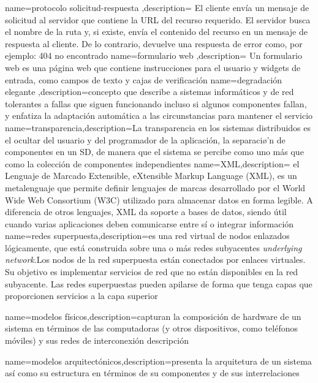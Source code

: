 {name={protocolo solicitud-respuesta },description={ El cliente envía un mensaje de solicitud al servidor que contiene la URL del recurso requerido. El servidor busca el nombre de la ruta y, si existe, envía el contenido del recurso en un 	mensaje de respuesta al cliente. De lo contrario, devuelve una respuesta de error como, por ejemplo: 404 no encontrado}}
{name={formulario web },description={ Un formulario web es una página web que contiene instrucciones para el usuario y widgets de entrada, como campos de texto y cajas de verificación }}
{name={degradaci\'on elegante },description={concepto que describe a sistemas inform\'aticos y de red tolerantes a fallas que siguen funcionando incluso si algunos componentes fallan, y enfatiza la adaptaci\'on autom\'atica a las circunstancias para mantener el servicio }}
{name={transparencia},description={La transparencia en los sistemas distribuidos es el  ocultar del usuario y del programador de la aplicaci\'on,  la separaci\o'n de componentes en un SD, de manera que el sistema se percibe como uno m\'as que como la colección de componentes independientes }}	
{name={XML},description={ el Lenguaje de Marcado Extensible,  eXtensible Markup Language (XML),  es un metalenguaje que permite definir lenguajes de marcas desarrollado por el World Wide Web Consortium (W3C) utilizado para almacenar datos en forma legible.   A diferencia de otros lenguajes, XML da soporte a bases de datos, siendo útil cuando varias aplicaciones deben comunicarse entre sí o integrar información }}	
{name={redes superpuesta},description={es una red virtual de nodos enlazados lógicamente, que está construida sobre una o más redes subyacentes \textit{underlying network}.Los nodos de la red superpuesta están conectados por enlaces virtuales. Su objetivo es implementar servicios de red que no están disponibles en la red subyacente. Las redes superpuestas pueden apilarse de forma que tenga capas que proporcionen servicios a la capa superior}}

{name={modelos f\'isicos},description={capturan  la composición de hardware de un sistema en términos de las computadoras (y otros dispositivos, como teléfonos móviles) y sus redes de interconexión descripción}}

{name={modelos arquitect\'onicos},description={presenta la arquitetura de un sistema as\'i como su estructura en t\'erminos de su componentes y de sus interrelaciones }}


